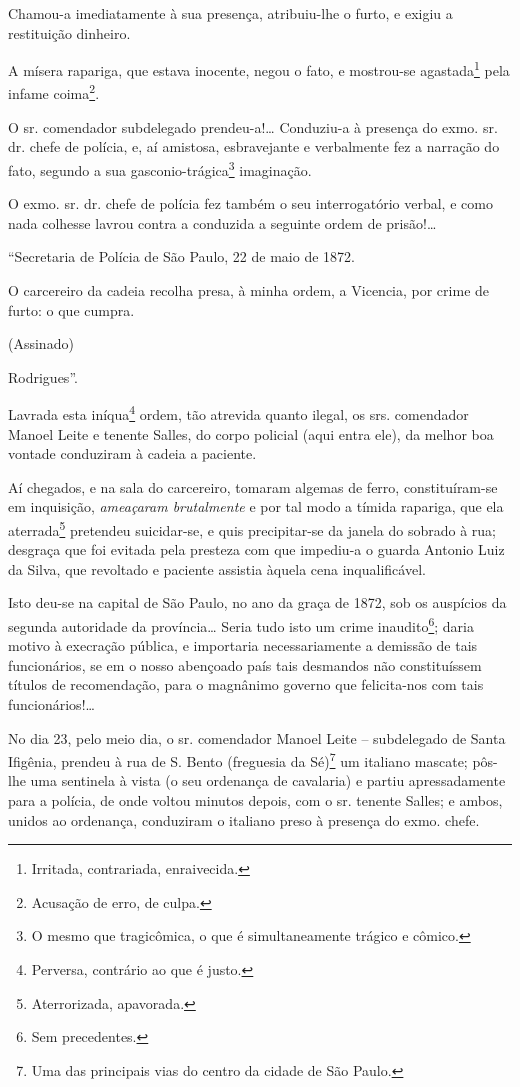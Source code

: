 {\begin{flushright}
Chamou-a imediatamente à sua presença, atribuiu-lhe o furto, e exigiu a
restituição dinheiro.

A mísera rapariga, que estava inocente, negou o fato, e mostrou-se
agastada\footnote{ Irritada, contrariada, enraivecida.} pela infame
coima\footnote{ Acusação de erro, de culpa.}.

O sr. comendador subdelegado prendeu-a!\ldots{} Conduziu-a à presença do
exmo. sr. dr. chefe de polícia, e, aí amistosa, esbravejante e
verbalmente fez a narração do fato, segundo a sua
gasconio-trágica\footnote{ O mesmo que tragicômica, o que é
  simultaneamente trágico e cômico.} imaginação.

O exmo. sr. dr. chefe de polícia fez também o seu interrogatório verbal,
e como nada colhesse lavrou contra a conduzida a seguinte ordem de
prisão!\ldots{}

``Secretaria de Polícia de São Paulo, 22 de maio de 1872.

O carcereiro da cadeia recolha presa, à minha ordem, a Vicencia, por
crime de furto: o que cumpra.

(Assinado)

Rodrigues''.

Lavrada esta iníqua\footnote{ Perversa, contrário ao que é justo.}
ordem, tão atrevida quanto ilegal, os srs. comendador Manoel Leite e
tenente Salles, do corpo policial (aqui entra ele), da melhor boa
vontade conduziram à cadeia a paciente.

Aí chegados, e na sala do carcereiro, tomaram algemas de ferro,
constituíram-se em inquisição, \emph{ameaçaram brutalmente} e por tal
modo a tímida rapariga, que ela aterrada\footnote{ Aterrorizada,
  apavorada.} pretendeu suicidar-se, e quis precipitar-se da janela do
sobrado à rua; desgraça que foi evitada pela presteza com que impediu-a
o guarda Antonio Luiz da Silva, que revoltado e paciente assistia àquela
cena inqualificável.

Isto deu-se na capital de São Paulo, no ano da graça de 1872, sob os
auspícios da segunda autoridade da província\ldots{} Seria tudo isto um crime
inaudito\footnote{ Sem precedentes.}; daria motivo à execração pública,
e importaria necessariamente a demissão de tais funcionários, se em o
nosso abençoado país tais desmandos não constituíssem títulos de
recomendação, para o magnânimo governo que felicita-nos com tais
funcionários!\ldots{}

No dia 23, pelo meio dia, o sr. comendador Manoel Leite -- subdelegado
de Santa Ifigênia, prendeu à rua de S. Bento (freguesia da
Sé)\footnote{ Uma das principais vias do centro da cidade de São Paulo.}
um italiano mascate; pôs-lhe uma sentinela à vista (o seu ordenança de
cavalaria) e partiu apressadamente para a polícia, de onde voltou
minutos depois, com o sr. tenente Salles; e ambos, unidos ao ordenança,
conduziram o italiano preso à presença do exmo. chefe.


\end{flushright}}
